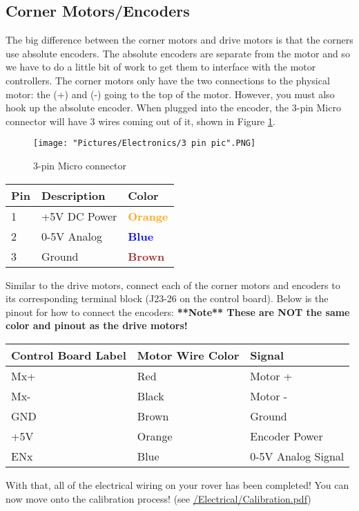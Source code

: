 \documentclass{article}
\begin{document}
\subsection{Corner Motors/Encoders}
The big difference between the corner motors and drive motors is that the corners use absolute encoders. The absolute encoders are separate from the motor and so we have to do a little bit of work to get them to interface with the motor controllers. The corner motors only have the two connections to the physical motor: the (+) and (-) going to the top of the motor. However, you must also hook up the absolute encoder. When plugged into the encoder, the 3-pin Micro connector will have 3 wires coming out of it, shown in Figure \ref{3pin}.

\bigskip 

\begin{figure}[H]
 	\centering
	\texttt{[image: "Pictures/Electronics/3 pin pic".PNG]}
 	\caption{3-pin Micro connector}
	\label{3pin}
\end{figure}

\bigskip
\begin{tabular}[3] {| p{3cm} | p{7cm} | p{3cm} | }
	\hline
	\textbf{Pin} & \textbf{Description} & \textbf{Color} \\ \hline
	1 & +5V DC Power & \textcolor{orange}{\textbf{Orange}} \\ \hline
	2 & 0-5V Analog & \textcolor{blue}{\textbf{Blue}} \\ \hline
	3 & Ground & \textcolor{brown}{\textbf{Brown}} \\ \hline
\end{tabular}

\bigskip

Similar to the drive motors, connect each of the corner motors and encoders to its corresponding terminal block (J23-26 on the control board). Below is the pinout for how to connect the encoders: \textbf{**Note** These are NOT the same color and pinout as the drive motors!}

\bigskip

\begin{tabular}[3] {| l | l | l |}
	\hline
	\textbf{Control Board Label} & \textbf{Motor Wire Color} & \textbf{Signal} \\ \hline
	Mx+ & Red & Motor + \\ \hline
	Mx- & Black & Motor - \\ \hline
	GND & Brown & Ground \\ \hline
	+5V & Orange & Encoder Power \\ \hline
	ENx & Blue & 0-5V Analog Signal \\ \hline
	\hline
\end{tabular} 

\bigskip 
With that, all of the electrical wiring on your rover has been completed! You can now move onto the calibration process!  (see \href{https://github.com/nasa-jpl/open-source-rover/blob/master/Electrical/Calibration.pdf}{/Electrical/Calibration.pdf})
\end{document}
